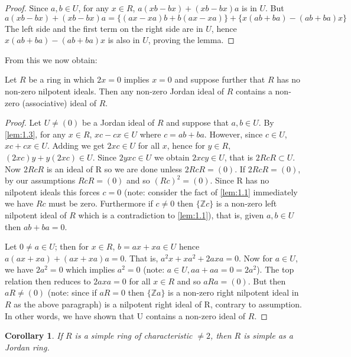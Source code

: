 \documentclass{article}
\newtheorem{corollary}[theorem]{Corollary}
\begin{document}
\begin{proof}  
Since $a,b \in U$, for any $x \in R$, $a(xb - bx) + (xb - bx)a$ is in $U$. But  
\[ a(xb - bx) + (xb - bx)a = \{(ax - xa)b + b(ax - xa)\} + \{x(ab + ba) - (ab + ba)x\} \]  
The left side and the first term on the right side are in $U$, hence $x(ab + ba) - (ab + ba)x$ is also in $U$, proving the lemma.  
\end{proof}  

From this we now obtain:

\begin{theorem}\label{thm:1.4}  
Let $ R $ be a ring in which $2x = 0$ implies $x = 0$ and suppose further that $ R $ has no non-zero nilpotent ideals. Then any non-zero Jordan ideal of $ R $ contains a non-zero (associative) ideal of $ R $.  
\end{theorem}  

\begin{proof}  
Let $U \neq (0)$ be a Jordan ideal of $ R $ and suppose that $a, b \in U$. By \ref{lem:1.3}, for any $x \in R$, $xc - cx \in U$ where $c = ab + ba$. However, since $c \in U$, $xc + cx \in U$. Adding we get $2xc \in U$ for all $ x $, hence for $y \in R$, $(2xc)y + y(2xc) \in U$. Since $2yxc \in U$ we obtain $2xcy \in U$, that is $2RcR \subset U$. Now $2RcR$ is an ideal of R so we are done unless $2RcR = (0)$. If $2RcR = (0)$, by our assumptions $RcR = (0)$ and so $(Rc)^2 = (0)$. Since R has no nilpotent ideals this forces $c = 0$ (note: consider the fact of \ref{lem:1.1} immediately we have $ Rc $ must be zero. Furthermore if $ c \neq 0 $ then $ \{\mathbb{Z}c\} $ is a non-zero left nilpotent ideal of $ R $ which is a contradiction to \ref{lem:1.1}), that is, given $a, b \in U$ then $ab + ba = 0$.  

Let $0 \neq a \in U$; then for $x \in R$, $b = ax + xa \in U$ hence $a(ax + xa) + (ax + xa)a = 0$. That is, $a^2x + xa^2 + 2axa = 0$. Now for $a \in U$, we have $2a^2 = 0$ which implies $a^2 = 0$ (note: $ a \in U , aa+aa=0=2a^2$). The top relation then reduces to $2axa = 0$ for all $x \in R$ and so $aRa = (0)$. But then $aR \neq (0)$ (note: since if $ aR=0 $ then $ \{\mathbb{Z}a\} $ is a non-zero right nilpotent ideal in $ R $ as the above paragraph) is a nilpotent right ideal of R, contrary to assumption. In other words, we have shown that U contains a non-zero ideal of $ R $.  
\end{proof} 

\begin{corollary}\label{cor:1.5}  
If $R$ is a simple ring of characteristic $\neq 2$, then $R$ is simple as a Jordan ring.  
\end{corollary}  
\end{document}
